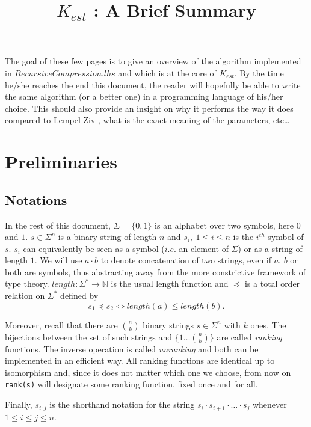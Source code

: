 \documentclass[12pt]{amsart}
\title{$K_{est}$ : A Brief Summary}
\author{}
\date{}
\theoremstyle{definition}
\theoremstyle{remark}
\theoremstyle{definition}
\theoremstyle{remark}
\begin{document}
	\maketitle

	The goal of these few pages is to give an overview of the algorithm implemented in $RecursiveCompression.lhs$ and which is at the core
	of $K_{est}$. By the time he/she reaches the end this document, the reader will hopefully be able to write the same algorithm (or a better one) in a programming 
	language of his/her choice. This should also provide an insight on why it performs the way it does compared to Lempel-Ziv \cite{LZ},
	what is the exact meaning of the parameters, etc\dots

	\section*{Preliminaries}


	\subsection*{Notations}

		In the rest of this document, $\Sigma = \{0,1\}$ is an alphabet over two symbols, here $0$ and $1$. $s \in \Sigma^n$ is a binary string
		of length $n$ and $s_i,~1 \leq i \leq n$ is the $i^{th}$ symbol of $s$. $s_i$ can equivalently be seen as a symbol ($i.e.$ an element
		of $\Sigma$) or as a string of length $1$. We will use $a \cdot b$ to denote concatenation of two strings, even if $a$, $b$ or both 
		are symbols, thus abstracting away from the more constrictive framework of type theory. $length : \Sigma^\ast \to \mathbb{N}$ is
		the usual length function and $\preceq$ is a total order relation on
		$\Sigma^\ast$ defined by
		\[ s_1 \preceq s_2 \Leftrightarrow length(a) \leq length(b).\]
		
		Moreover, recall that there are ${n \choose k}$ binary strings $s \in \Sigma^n$ with $k$ ones. The bijections between
		the set of such strings and $\{1\dots {n \choose k}\}$ are called \emph{ranking} functions. The inverse operation is called
		\emph{unranking} and both can be implemented in an efficient way. All ranking functions are identical up to 
		isomorphism and, since it does not matter which one we choose, from now on \texttt{rank(s)} will designate some ranking function, fixed once and for all.

		Finally, $s_{i:j}$ is the shorthand notation
		for the string $s_i \cdot s_{i+1} \cdot \dots \cdot s_{j}$ whenever $1 \leq i \leq j \leq n$.
\end{document}
